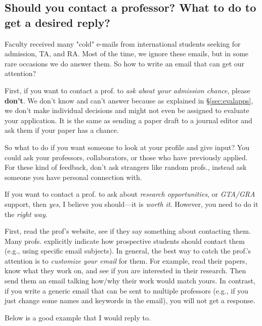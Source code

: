 \documentclass[oneside,11pt]{memoir}
\begin{document}
\subsection{Should you contact a professor? What to do to get a desired reply?}\label{sec:contact}

Faculty received many "cold" e-mails from international students seeking for admission, TA, and RA. Most of the time, we ignore these emails, but in some rare occasions we do answer them. So how to write an email that can get our attention?



First, if you want to contact a prof. to \emph{ask about your admission chance}, please \textbf{don't}. We don't know and can't answer because as explained in \S\ref{sec:evalapps}, we don't make individual decisions and might not even be assigned to evaluate your application.  It is the same as sending a paper draft to a journal editor and ask them if your paper has a chance.  

So what to do if you want someone to look at your profile and give input? You could ask your professors, collaborators, or those who have previously applied. For these kind of feedback,  don't ask strangers like random profs., instead ask someone you have personal connection with.  

If you want to contact a prof. to ask about \emph{research opportunities}, or \emph{GTA/GRA} support, then \emph{yes}, I believe you should---it is \emph{worth it}. However, you need to do it the \emph{right way}.



First, read the prof's website, see if they say something about contacting them. Many profs. explicitly indicate how prospective students should contact them (e.g., using specific email subjects). 
In general, the best way to catch the prof.'s attention is to \emph{customize your email} for them.  For example, read their papers, know what they work on, and see if you are interested in their research. Then send them an email talking how/why their work would match yours.
In contrast, if you write a generic email that can be sent to multiple professors (e.g., if you just change some names and keywords in the email), you will not get a response. 

Below is a good example that I would reply to.   
\end{document}
